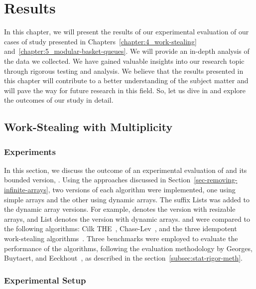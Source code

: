 \chapter{\label{chapter:6_Results}Results}

In this chapter, we will present the results of our experimental evaluation of our cases of study presented in Chapters~\ref{chapter:4_work-stealing} and~\ref{chapter:5_modular-basket-queues}. We will provide an in-depth analysis of the data we collected. We have gained valuable insights into our research topic through rigorous testing and analysis. We believe that the results presented in this chapter will contribute to a better understanding of the subject matter and will pave the way for future research in this field. So, let us dive in and explore the outcomes of our study in detail.

\section{Work-Stealing with Multiplicity}

\subsection{\label{sec-experiments}Experiments}

In this section, we discuss the outcome of an experimental evaluation of \NCWSM and its bounded version, \BNCWSM.  Using the approaches discussed in Section~\ref{sec-removing-infinite-arrays}, two versions of each algorithm were implemented, one using simple arrays and the other using dynamic arrays. The suffix Lists was added to the dynamic array versions. For example, \NCWSM denotes the version with resizable arrays, and \NCWSM List denotes the version with dynamic arrays.  \NCWSM and \BNCWSM were compared to the following algorithms: Cilk THE~\cite{DBLP_conf_pldi_FrigoLR98}, Chase-Lev~\cite{circular.work.stealing}, and the three idempotent work-stealing algorithms~\cite{maged.vechev.2009}.  Three benchmarks were employed to evaluate the performance of the algorithms, following the evaluation methodology by Georges, Buytaert, and Eeckhout~\cite{DBLP_conf_oopsla_GeorgesBE07}, as described in the section~\ref{subsec:stat-rigor-meth}.

\subsection{\label{subsec-experimental-setup}Experimental Setup}

